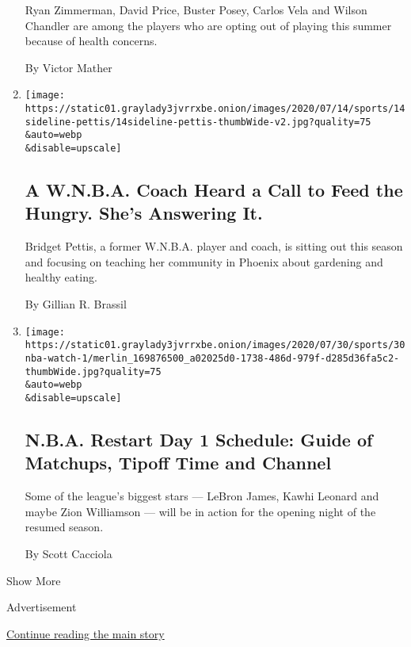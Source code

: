 \begin{enumerate}
  Ryan Zimmerman, David Price, Buster Posey, Carlos Vela and Wilson
  Chandler are among the players who are opting out of playing this
  summer because of health concerns.

  By Victor Mather
\item
  \href{/2020/07/30/sports/basketball/wnba-bridget-pettis.html}{}

  \texttt{[image: https://static01.graylady3jvrrxbe.onion/images/2020/07/14/sports/14sideline-pettis/14sideline-pettis-thumbWide-v2.jpg?quality=75\\\&auto=webp\\\&disable=upscale]}

  \hypertarget{a-wnba-coach-heard-a-call-to-feed-the-hungry-shes-answering-it}{%
  \subsection{A W.N.B.A. Coach Heard a Call to Feed the Hungry. She's
  Answering
  It.}\label{a-wnba-coach-heard-a-call-to-feed-the-hungry-shes-answering-it}}

  Bridget Pettis, a former W.N.B.A. player and coach, is sitting out
  this season and focusing on teaching her community in Phoenix about
  gardening and healthy eating.

  By Gillian R. Brassil
\item
  \href{/2020/07/30/sports/basketball/nba-schedule.html}{}

  \texttt{[image: https://static01.graylady3jvrrxbe.onion/images/2020/07/30/sports/30nba-watch-1/merlin\_169876500\_a02025d0-1738-486d-979f-d285d36fa5c2-thumbWide.jpg?quality=75\\\&auto=webp\\\&disable=upscale]}

  \hypertarget{nba-restart-day-1-schedule-guide-of-matchups-tipoff-time-and-channel}{%
  \subsection{N.B.A. Restart Day 1 Schedule: Guide of Matchups, Tipoff
  Time and
  Channel}\label{nba-restart-day-1-schedule-guide-of-matchups-tipoff-time-and-channel}}

  Some of the league's biggest stars --- LeBron James, Kawhi Leonard and
  maybe Zion Williamson --- will be in action for the opening night of
  the resumed season.

  By Scott Cacciola
\end{enumerate}

Show More

Advertisement

\protect\hyperlink{after-mid1}{Continue reading the main story}


